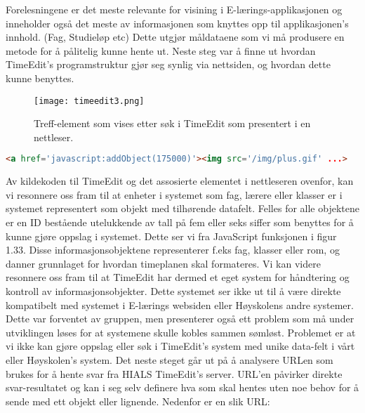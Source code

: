 \documentclass[../main.tex]{subfiles}
\begin{document}
Forelesningene er det meste relevante for visining i E-lærings-applikasjonen og inneholder også det meste av informasjonen som knyttes opp til applikasjonen’s innhold. (Fag, Studieløp etc)
Dette utgjør måldataene som vi må produsere en metode for å pålitelig kunne hente ut.\newline
\newline
Neste steg var å finne ut hvordan TimeEdit’s programstruktur gjør seg synlig via nettsiden, og hvordan dette kunne benyttes.

\begin{figure}[H]
  \centering
  \texttt{[image: timeedit3.png]}
\caption{Treff-element som vises etter søk i TimeEdit som presentert i en nettleser.}
\end{figure}

\begin{lstlisting}[language=HTML, frame=single, caption={Utdrag av kildekoden til TimeEdit's nettside som vist i figur 1.32}, label={lst:timeeditb}]
<a href='javascript:addObject(175000)'><img src='/img/plus.gif' ...>
\end{lstlisting}

Av kildekoden til TimeEdit og det assosierte elementet i nettleseren ovenfor, kan vi resonnere oss fram til at enheter i systemet som fag, lærere eller klasser er i systemet representert som objekt med tilhørende datafelt. Felles for alle objektene er en ID bestående utelukkende av tall på fem eller seks siffer som benyttes for å kunne gjøre oppslag i systemet. Dette ser vi fra JavaScript funksjonen i figur 1.33. Disse informasjonsobjektene representerer f.eks fag, klasser eller rom, og danner grunnlaget for hvordan timeplanen skal formateres. Vi kan videre resonnere oss fram til at TimeEdit har dermed et eget system for håndtering og kontroll av informasjonsobjekter. Dette systemet ser ikke ut til å være direkte kompatibelt med systemet i E-lærings websiden eller Høyskolens andre systemer. Dette var forventet av gruppen, men presenterer også ett problem som må under utviklingen løses for at systemene skulle kobles sammen sømløst. Problemet er at vi ikke kan gjøre oppslag eller søk i TimeEdit's system med unike data-felt i vårt eller Høyskolen's system. \newline
Det neste steget går ut på å analysere URLen som brukes for å hente svar fra HIALS TimeEdit's server. URL'en påvirker direkte svar-resultatet og kan i seg selv definere hva som skal hentes uten noe behov for å sende med ett objekt eller lignende. Nedenfor er en slik URL:
\end{document}
